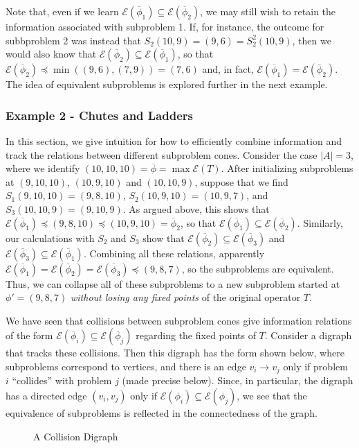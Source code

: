 \documentclass[11pt,reqno]{amsart}
\theoremstyle{definition}
\numberwithin{equation}{section}
\newcommand{\ol}{\overline}
\newcommand{\pre}{\phi}
\newcommand{\sub}{\subseteq}
\newcommand{\fix}{\mathcal{E}}
\newcommand{\peq}{\preceq}
\newcommand{\toppre}{\ol{\pre}}
\begin{document}
Note that, even if we learn $\fix(\toppre_1) \sub \fix(\toppre_2)$, we may still wish to retain the information associated with subproblem 1. 
If, for instance, the outcome for subbproblem 2 was instead that $S_2(10,9) =  (9,6) = S_2^2(10,9)$, then we would also know that $\fix(\toppre_2) \sub \fix(\toppre_1)$, so that $\fix(\toppre_2) \peq \min((9,6),(7,9)) = (7,6)$ and, in fact, $\fix(\toppre_1) = \fix(\toppre_2)$.
The idea of equivalent subproblems is explored further in the next example. 

\subsubsection{Example 2 - Chutes and Ladders}
In this section, we give intuition for how to efficiently combine information and track the relations between different subproblem cones. 
Consider the case $|A| = 3$, where we identify $(10,10,10) = \toppre = \max \fix(T)$. 
After initializing subproblems at $(9,10,10)$, $(10,9,10)$ and $(10,10,9)$, suppose that we find $S_1(9,10,10) = (9,8,10)$, $S_2(10,9,10) = (10,9,7)$, and $S_3(10,10,9) = (9,10,9)$. 
As argued above, this shows that $\fix(\toppre_1) \peq (9,8,10) \peq (10,9,10) = \toppre_2$, so that $\fix(\toppre_1) \sub \fix(\toppre_2)$. 
Similarly, our calculations with $S_2$ and $S_3$ show that $\fix(\toppre_2) \sub \fix(\toppre_3)$ and $\fix(\toppre_3) \sub \fix(\toppre_1)$. 
Combining all these relations, apparently $\fix(\toppre_1) = \fix(\toppre_2) = \fix(\toppre_3) \peq (9,8,7)$, so the subproblems are equivalent.  
Thus, we can collapse all of these subproblems to a new subproblem started at $\pre' = (9,8,7)$ \emph{without losing any fixed points} of the original operator $T$. 

We have seen that collisions between subproblem cones give information relations of the form $\fix(\toppre_i) \sub \fix(\toppre_j)$ regarding the fixed points of $T$.
Consider a digraph that tracks these collisions.
Then this digraph has the form shown below, where subproblems correspond to vertices, and there is an edge $v_i \to v_j$ only if problem $i$ ``collides'' with problem $j$ (made precise below). 
Since, in particular, the digraph has a directed edge $(v_i,v_j)$ only if $\fix(\pre_i) \sub \fix(\pre_j)$, we see that the equivalence of subproblems is reflected in the connectedness of the graph. 

\begin{figure} \label{fig:digraph}
\caption{A Collision Digraph}
\end{figure}
\end{document}
